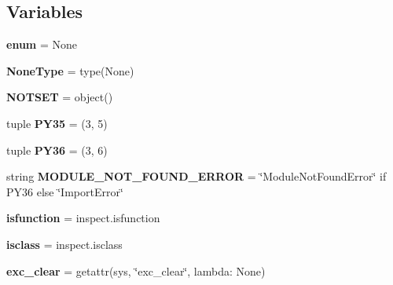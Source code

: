 \subsection*{Variables}
\begin{DoxyCompactItemize}
\item 
\mbox{\label{namespace__pytest_1_1compat_a3666ad003430c603f42226cb52853a53}} 
{\bfseries enum} = None
\item 
\mbox{\label{namespace__pytest_1_1compat_aa6a8e9e49ed943c81f600c181c15ee78}} 
{\bfseries None\+Type} = type(None)
\item 
\mbox{\label{namespace__pytest_1_1compat_a06ed38e60dc8a3cc670547e61a8edf22}} 
{\bfseries N\+O\+T\+S\+ET} = object()
\item 
\mbox{\label{namespace__pytest_1_1compat_ad98312f90019865092fd20f5c2603fed}} 
tuple {\bfseries P\+Y35} = (3, 5)
\item 
\mbox{\label{namespace__pytest_1_1compat_a77644981ed99a94975a94edb8c8874a1}} 
tuple {\bfseries P\+Y36} = (3, 6)
\item 
\mbox{\label{namespace__pytest_1_1compat_ae6e6703cf2f325ac4a31a4c05d0da1c3}} 
string {\bfseries M\+O\+D\+U\+L\+E\+\_\+\+N\+O\+T\+\_\+\+F\+O\+U\+N\+D\+\_\+\+E\+R\+R\+OR} = \char`\"{}Module\+Not\+Found\+Error\char`\"{} if P\+Y36 else \char`\"{}Import\+Error\char`\"{}
\item 
\mbox{\label{namespace__pytest_1_1compat_ade3b11e38139a477e647c2932fa3fcf4}} 
{\bfseries isfunction} = inspect.\+isfunction
\item 
\mbox{\label{namespace__pytest_1_1compat_a2915123797e8004cb9f5d4f36d87ddea}} 
{\bfseries isclass} = inspect.\+isclass
\item 
\mbox{\label{namespace__pytest_1_1compat_a46dc3d6c1f88883dbf98ab74f5b879db}} 
{\bfseries exc\+\_\+clear} = getattr(sys, \char`\"{}exc\+\_\+clear\char`\"{}, lambda\+: None)
\item 

\end{DoxyCompactItemize}
